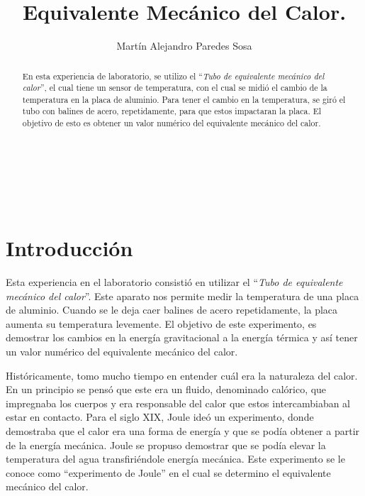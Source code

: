 \documentclass[12pt]{article}
\title{Equivalente Mecánico del Calor.}
\author{Martín Alejandro Paredes Sosa}
\makeatletter
\let\thetitle\@title
\let\theauthor\@author
\makeatother
\begin{document}
\begin{center}
{ \large \bfseries \thetitle}\\
\end{center}
	\begin{minipage}{\textwidth}
		\begin{center} 
			\theauthor 
			\end{center}
	\end{minipage}\\[-0.52 cm]
\begin{abstract}
	En esta experiencia de laboratorio, se utilizo el ``\textit{Tubo de equivalente mecánico del calor}'', el cual tiene un sensor de temperatura, con el cual se midió el cambio de la temperatura en la placa de aluminio. Para tener el cambio en la temperatura, se giró el tubo con balines de acero, repetidamente, para que estos impactaran la placa. El objetivo de esto es obtener un valor numérico del equivalente mecánico del calor.

\end{abstract}
\vspace{-1cm}
\section{Introducción}
\vspace{-0.5cm}
Esta experiencia en el laboratorio consistió en utilizar el ``\textit{Tubo de equivalente mecánico del calor}''. Este aparato nos permite medir la temperatura de una placa de aluminio. Cuando se le deja caer balines de acero repetidamente, la placa aumenta su temperatura levemente. El objetivo de este experimento, es demostrar los cambios en la energía gravitacional a la energía térmica y así tener un valor numérico del equivalente mecánico del calor. 

\hspace{0.5cm} Históricamente, tomo mucho tiempo en entender cuál era la naturaleza del calor. En un principio se pensó que este era un fluido, denominado calórico, que impregnaba los cuerpos y era responsable del calor que estos intercambiaban al estar en contacto. Para el siglo XIX, Joule ideó un experimento, donde demostraba que el calor era una forma de energía y que se podía obtener a partir de la energía mecánica. Joule se propuso demostrar que se podía elevar la temperatura del agua transfiriéndole energía mecánica. Este experimento se le conoce como ``experimento de Joule'' en el cual se determino el equivalente mecánico del calor.
\end{document}
